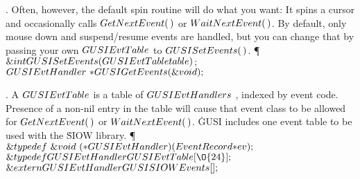. Often, however, the default spin routine will do what you want: It spins
a
cursor and occasionally calls \CD{}$\\{GetNextEvent}(\,)$\DC{} or \CD{}$%
\\{WaitNextEvent}(\,)$\DC{}. By default,
only mouse down and suspend/resume events are handled, but you can change that
by passing your own \CD{}$\\{GUSIEvtTable}$\DC{} to \CD{}$\\{GUSISetEvents}(%
\,)$\DC{}.
\Y\P $\&{int}\ \\{GUSISetEvents}(\\{GUSIEvtTable}\ \\{table})$\1$;$\2\7
$\\{GUSIEvtHandler}\ {{*}}\\{GUSIGetEvents}(\&{void});$\par
\fi

. A \CD{}$\\{GUSIEvtTable}$\DC{} is a table of \CD{}$\\{GUSIEvtHandlers}$%
\DC{}, indexed by event code. Presence
of a non-nil entry in the table will cause that event class to be allowed for
\CD{}$\\{GetNextEvent}(\,)$\DC{} or \CD{}$\\{WaitNextEvent}(\,)$\DC{}. \.{GUSI}
includes one event table to
be used with the \.{SIOW} library.
\Y\P $\&{typedef}\ \&{void}\ ({{*}}\\{GUSIEvtHandler})(\\{EventRecord}{*}%
\\{ev});$\6
$\&{typedef}\ \\{GUSIEvtHandler}\ \\{GUSIEvtTable}[\O{24}];$\7
$\&{extern}\ \\{GUSIEvtHandler}\ \\{GUSISIOWEvents}[];$\par
\fi

